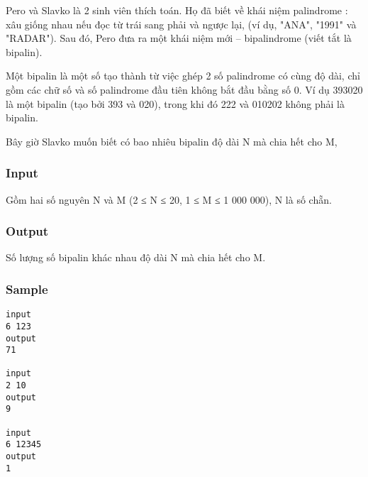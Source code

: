 









   Pero và Slavko là 2 sinh viên thích toán. Họ đã biết về khái niệm palindrome : xâu giống nhau nếu đọc từ trái sang phải và ngược lại, (ví dụ,  "ANA",  "1991"  và "RADAR"). Sau đó, Pero đưa ra một khái niệm mới –  bipalindrome (viết tắt là bipalin).  

   Một bipalin  là một số tạo thành từ việc ghép 2 số palindrome có cùng độ dài, chỉ gồm các chữ số và số palindrome đầu tiên không bắt đầu bằng số 0. Ví dụ  393020 là một bipalin (tạo bởi 393 và 020), trong khi đó 222 và 010202 không phải là bipalin.  

   Bây giờ Slavko muốn biết có bao nhiêu bipalin độ dài N mà chia hết cho M,  



\subsubsection{   Input  }



   Gồm hai số nguyên N và M (2 ≤ N ≤ 20, 1 ≤ M ≤ 1 000 000),  N là số chẵn.  



\subsubsection{   Output  }



   Số lượng số bipalin khác nhau độ dài N mà chia hết cho M.  



\subsubsection{   Sample  }
\begin{verbatim}
input 
6 123 
output 
71 

input 
2 10 
output 
9

input 
6 12345 
output 
1 
\end{verbatim}

